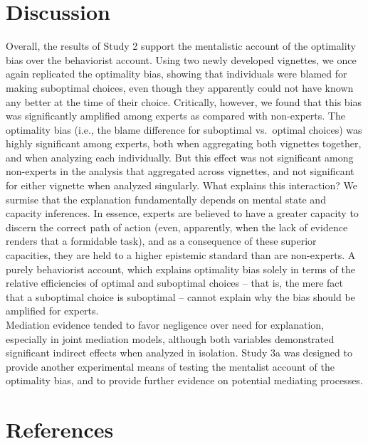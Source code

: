 \documentclass[
  man,floatsintext]{apa6}
\begin{document}
\hypertarget{discussion}{%
\section{Discussion}\label{discussion}}

Overall, the results of Study 2 support the mentalistic account of the optimality bias over the behaviorist account. Using two newly developed vignettes, we once again replicated the optimality bias, showing that individuals were blamed for making suboptimal choices, even though they apparently could not have known any better at the time of their choice. Critically, however, we found that this bias was significantly amplified among experts as compared with non-experts. The optimality bias (i.e., the blame difference for suboptimal vs.~optimal choices) was highly significant among experts, both when aggregating both vignettes together, and when analyzing each individually. But this effect was not significant among non-experts in the analysis that aggregated across vignettes, and not significant for either vignette when analyzed singularly. What explains this interaction? We surmise that the explanation fundamentally depends on mental state and capacity inferences. In essence, experts are believed to have a greater capacity to discern the correct path of action (even, apparently, when the lack of evidence renders that a formidable task), and as a consequence of these superior capacities, they are held to a higher epistemic standard than are non-experts. A purely behaviorist account, which explains optimality bias solely in terms of the relative efficiencies of optimal and suboptimal choices -- that is, the mere fact that a suboptimal choice is suboptimal -- cannot explain why the bias should be amplified for experts.\\
Mediation evidence tended to favor negligence over need for explanation, especially in joint mediation models, although both variables demonstrated significant indirect effects when analyzed in isolation. Study 3a was designed to provide another experimental means of testing the mentalist account of the optimality bias, and to provide further evidence on potential mediating processes.

\newpage

\hypertarget{references}{%
\section*{References}\label{references}}
\end{document}
